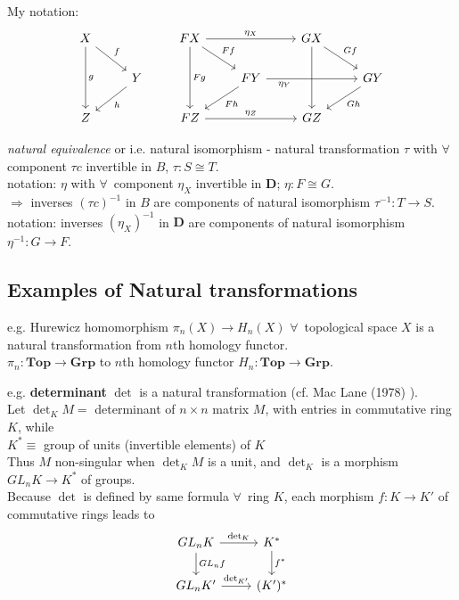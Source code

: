 \documentclass[10pt]{amsart}
\begin{document}
\begin{multicols*}{2}
My notation:
\[
\begin{gathered}
\begin{tikzcd}
X \arrow{dr}{f} \arrow{dd}{g} & \\
& Y \arrow{dl}{h} \\ 
Z & 
\end{tikzcd} \qquad \,
\begin{tikzcd}
FX \arrow{dr}{Ff} \arrow{dd}{Fg} \arrow{rr}{\eta_X} & & GX \arrow[dd, crossing over]{} \arrow{dr}{Gf} &  \\
& FY \arrow{dl}{Fh} \arrow{rr}[swap, pos=0.2]{\eta_Y} & & GY \arrow{dl}{Gh} \\ 
FZ \arrow{rr}{\eta_Z} & & GZ & 
\end{tikzcd} 
\end{gathered}
\]

\emph{natural equivalence} or i.e. natural isomorphism - natural transformation $\tau$ with $\forall \, $ component $\tau c$ invertible in $B$, $\tau : S \cong T$.  \\
notation: $\eta$ with $\forall \, $ component $\eta_X$ invertible in $\mathbf{D}$; $\eta : F \cong G$. \\
$\Longrightarrow $ inverses $(\tau c)^{-1}$ in $B$ are components of natural isomorphism $\tau^{-1} :T \to S$. \\
notation: inverses $(\eta_X)^{-1}$ in $\mathbf{D}$ are components of natural isomorphism $\eta^{-1}: G\to F$. 


\subsection{Examples of Natural transformations}

e.g. Hurewicz homomorphism $\pi_n(X) \to H_n(X)$ $\forall \, $ topological space $X$ is a natural transformation from $n$th homology functor. \\
$\pi_n : \textbf{Top} \to \mathbf{Grp}$ to $n$th homology functor $H_n : \textbf{Top} \to \textbf{Grp}$.

e.g. \textbf{determinant} $\det$ is a natural transformation (cf. Mac Lane (1978) \cite{MacL1978}). \\
Let $\det_KM = $ determinant of $n\times n$ matrix $M$, with entries in commutative ring $K$, while \\
$K^* \equiv $ group of units (invertible elements) of $K$ \\

Thus $M$ non-singular when $\det_KM$ is a unit, and $\det_K$ is a morphism $GL_nK \to K^*$ of groups. \\
Because $\det$ is defined by same formula $\forall \,$ ring $K$, each morphism $f: K \to K'$ of commutative rings leads to 
\[
\begin{tikzcd}
GL_nK \arrow{d}{GL_nf} \arrow{r}{\det_K} & K^* \arrow{d}{f^*} \\
GL_nK' \arrow{r}{\det_{K'}} & (K')^*
\end{tikzcd}
\]


\end{multicols*}
\end{document}
